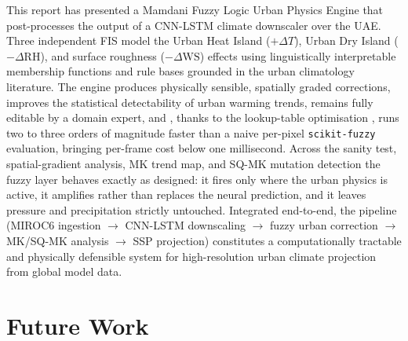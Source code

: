 \documentclass[conference]{IEEEtran}
\begin{document}
This report has presented a Mamdani Fuzzy Logic Urban Physics Engine that
post-processes the output of a CNN-LSTM climate downscaler over the
UAE.  Three independent FIS model the Urban Heat Island
(\(+\Delta T\)), Urban Dry Island (\(-\Delta\mathrm{RH}\)), and surface
roughness (\(-\Delta\mathrm{WS}\)) effects using linguistically
interpretable membership functions and rule bases grounded in the urban
climatology literature.  The engine produces physically
sensible, spatially graded corrections, improves the statistical
detectability of urban warming trends, remains fully editable by a domain
expert, and ,  thanks to the lookup-table optimisation ,  runs two to
three orders of magnitude faster than a naive per-pixel
\texttt{scikit-fuzzy} evaluation, bringing per-frame cost below one
millisecond.  Across the sanity test, spatial-gradient analysis, MK trend
map, and SQ-MK mutation detection the fuzzy layer behaves exactly as
designed: it fires only where the urban physics is active, it amplifies
rather than replaces the neural prediction, and it leaves pressure and
precipitation strictly untouched.  Integrated end-to-end, the pipeline
(MIROC6 ingestion \(\to\) CNN-LSTM downscaling \(\to\) fuzzy urban
correction \(\to\) MK/SQ-MK analysis \(\to\) SSP projection) constitutes
a computationally tractable and physically defensible system for
high-resolution urban climate projection from global model data.

\section{Future Work}
\label{sec:futurework}
\end{document}
